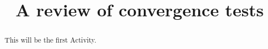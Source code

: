\documentclass{ximera}
\title[Dig-In:]{A review of convergence tests}
\begin{document}
\begin{abstract}
    This will be the first Activity.
\end{abstract}
\maketitle
\end{document}
